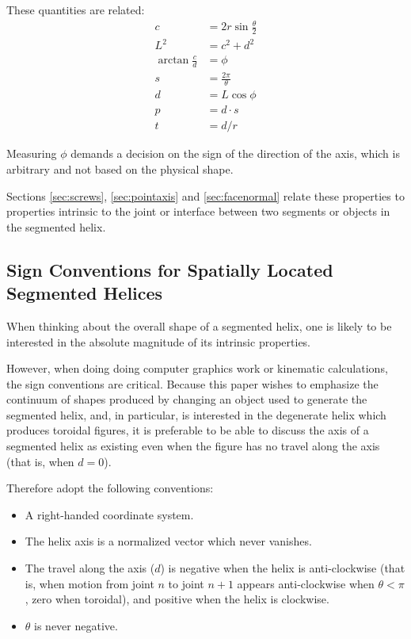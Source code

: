 \documentclass[11pt]{article}
\begin{document}
{\begin{itemize}
  \end{itemize}
These quantities are related:
\begin{align}
    c &= 2r\sin{\frac{\theta}{2}} \\
    L^2 &= c^2+d^2  \\
    \arctan{\frac{c}{d}}  &= \phi \\
    s &= \frac{2 \pi}{\theta} \\
    d &= L \cos{\phi} \\
    p &= d \cdot s \\
    t &= d / r
\end{align}

Measuring $\phi$ demands a decision on the sign of the direction of the axis,
which is arbitrary and not based on the
physical shape.

Sections \ref{sec:screws}, \ref{sec:pointaxis} and \ref{sec:facenormal}
relate these properties to properties intrinsic to the joint or interface between
two segments or objects in the segmented helix.

\label{sec:SegmentedHelix}

\subsection{Sign Conventions for Spatially Located Segmented Helices}

When thinking about the overall shape of a segmented helix, one is
likely to be interested in the absolute magnitude of its intrinsic
properties.

However, when doing doing computer graphics work or kinematic
calculations, the sign conventions are critical. Because this
paper wishes to emphasize the continuum of shapes produced by
changing an object used to generate the segmented helix, and,
in particular, is interested in the degenerate helix which
produces toroidal figures, it is preferable to be able to discuss
the axis of a segmented helix as existing even when the
figure has no travel along the axis (that is, when $d = 0$).

Therefore adopt the following conventions:
\begin{itemize}
\item A right-handed coordinate system.
\item The helix axis is a normalized vector
  which never vanishes.
\item The travel along the axis ($d$) is negative when
  the helix is anti-clockwise (that is, when motion from
  joint $n$ to joint $n+1$ appears anti-clockwise when $\theta < \pi$,
  zero when toroidal), and
  positive when the helix is clockwise.
\item $\theta$ is never negative.
\end{itemize}

}
\end{document}
